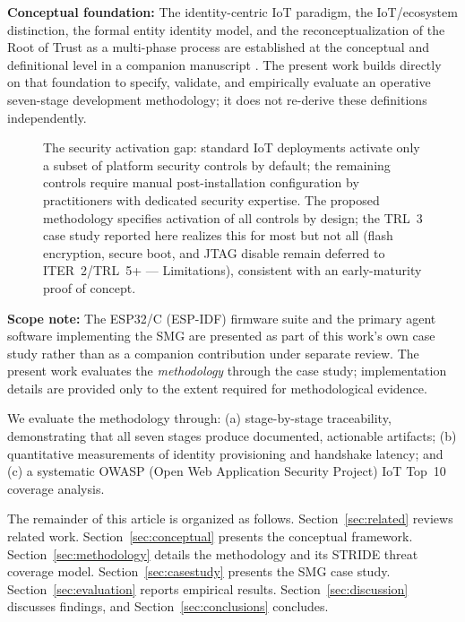\documentclass[preprint,12pt,authoryear]{elsarticle}
\begin{document}
\noindent\textbf{Conceptual foundation:} The identity-centric IoT paradigm, the IoT/ecosystem distinction, the formal entity identity model, and the reconceptualization of the Root of Trust as a multi-phase process are established at the conceptual and definitional level in a companion manuscript \citep{campos2026identity}. The present work builds directly on that foundation to specify, validate, and empirically evaluate an operative seven-stage development methodology; it does not re-derive these definitions independently.

\begin{figure}[htbp]
    \centering
    
    \caption{The security activation gap: standard IoT deployments activate only a subset of platform security controls by default; the remaining controls require manual post-installation configuration by practitioners with dedicated security expertise. The proposed methodology specifies activation of all controls by design; the TRL~3 case study reported here realizes this for most but not all (flash encryption, secure boot, and JTAG disable remain deferred to ITER~2/TRL~5+ --- Limitations), consistent with an early-maturity proof of concept.}
    \label{fig:gap}
\end{figure}

\noindent\textbf{Scope note:} The ESP32/C (ESP-IDF) firmware suite and the primary agent software implementing the SMG are presented as part of this work's own case study rather than as a companion contribution under separate review. The present work evaluates the \emph{methodology} through the case study; implementation details are provided only to the extent required for methodological evidence.

We evaluate the methodology through: (a) stage-by-stage traceability, demonstrating that all seven stages produce documented, actionable artifacts; (b) quantitative measurements of identity provisioning and handshake latency; and (c) a systematic OWASP (Open Web Application Security Project) IoT Top~10 \citep{owasp2018iot} coverage analysis.

The remainder of this article is organized as follows. Section~\ref{sec:related} reviews related work. Section~\ref{sec:conceptual} presents the conceptual framework. Section~\ref{sec:methodology} details the methodology and its STRIDE threat coverage model. Section~\ref{sec:casestudy} presents the SMG case study. Section~\ref{sec:evaluation} reports empirical results. Section~\ref{sec:discussion} discusses findings, and Section~\ref{sec:conclusions} concludes.
\end{document}

